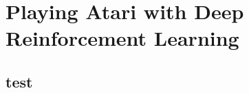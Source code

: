 \documentclass{standalone}
\begin{document}
\thesistranslationoriginal
\section{Playing Atari with Deep Reinforcement Learning}
\subsection{test}

\begin{figure}[H]
    \centering

\end{figure}




\end{document}
